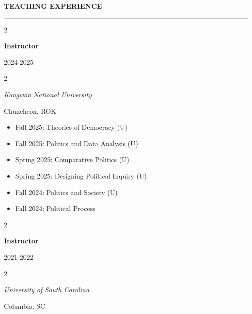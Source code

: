 \documentclass[
  16,
]{article}
\providecommand{\tightlist}{%
  \setlength{\itemsep}{0pt}\setlength{\parskip}{0pt}}
\begin{document}
\begin{large}{\bf TEACHING EXPERIENCE}
  \vspace{3pt}
  \hrule
  \begin{multicols}{2}
    \begin{flushleft}{\bf Instructor}\end{flushleft}
    \begin{flushright}2024-2025\end{flushright}
  \end{multicols}
  \vspace{-0.17cm}
  \begin{multicols}{2}
    \begin{flushleft}\textit{Kangwon National University}\end{flushleft}
    \begin{flushright}Chuncheon, ROK\end{flushright}
  \end{multicols}
  \end{large}
\vspace{-0.16cm}

\begin{itemize}
\tightlist
\item
  Fall 2025: Theories of Democracy (U)
\item
  Fall 2025: Politics and Data Analysis (U)
\item
  Spring 2025: Comparative Politics (U)
\item
  Spring 2025: Designing Political Inquiry (U)
\item
  Fall 2024: Politics and Society (U)
\item
  Fall 2024: Political Process
\end{itemize}

\vspace{7pt}

\vspace{3pt}

\begin{large}
  \begin{multicols}{2}
  \begin{flushleft}{\bf Instructor}\end{flushleft}
  \begin{flushright}2021-2022\end{flushright}
  \end{multicols}
  \vspace{-0.17cm}
  \begin{multicols}{2}
    \begin{flushleft}\textit{University of South Carolina}\end{flushleft}
    \begin{flushright}Columbia, SC\end{flushright}
  \end{multicols}
  \end{large}
\vspace{-0.16cm}
\end{document}

